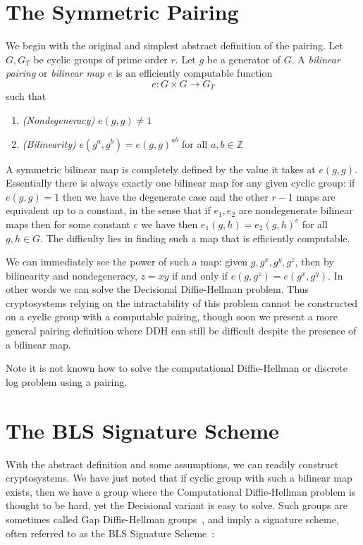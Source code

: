 \section{\label{sec:symmetricpairing}The Symmetric Pairing}

We begin with the original and simplest abstract definition of the pairing.
Let $G, G_T$ be cyclic groups of prime order $r$.
Let $g$ be a generator of $G$.
A \emph{bilinear pairing} or \emph{bilinear map}
$e$ is an efficiently computable function
\[
e:G \times G \rightarrow G_T
\]
such that
\begin{enumerate}
\item
\emph{(Nondegeneracy)}
$e(g,g) \ne 1$
\item
\emph{(Bilinearity)}
$e(g^a, g^b) = e(g,g)^{a b}$ for all $a, b \in \mathbb{Z}$
\end{enumerate}

A symmetric bilinear map is completely defined by the value it
takes at $e(g,g)$. Essentially there is always exactly one bilinear map
for any given cyclic group: if
$e(g,g)=1$ then we have the degenerate case and the other $r-1$ maps are
equivalent up to a constant,
in the sense that if $e_1, e_2$ are nondegenerate bilinear maps then for
some constant $c$ we have
then $e_1(g,h) = e_2(g,h)^c$ for all $g,h \in G$.
The difficulty lies in finding such a map
that is efficiently computable.

We can immediately see the power of such a map: given
$g, g^x, g^y, g^z$, then by bilinearity and nondegeneracy,
$z = x y$ if and only if
$e(g, g^z) = e(g^x, g^y)$. In other words we can solve the Decisional
Diffie-Hellman problem.
Thus cryptosystems relying on the intractability of this
problem cannot be constructed on a cyclic group with
a computable pairing, though soon we present a more general pairing
definition where DDH can still be difficult despite the presence of
a bilinear map.

Note it is not known how to solve the computational Diffie-Hellman
or discrete log problem using a pairing.

\section{The BLS Signature Scheme}

With the abstract definition and some assumptions,
we can readily construct cryptosystems.
We have just noted that if cyclic group with such a
bilinear map exists, then we have a group where the Computational
Diffie-Hellman
problem is thought to be hard, yet the Decisional variant is easy to solve.
Such groups are sometimes called Gap Diffie-Hellman groups~\cite{op}, and
imply a signature scheme,
often referred to as the BLS Signature Scheme~\cite{bls}:

